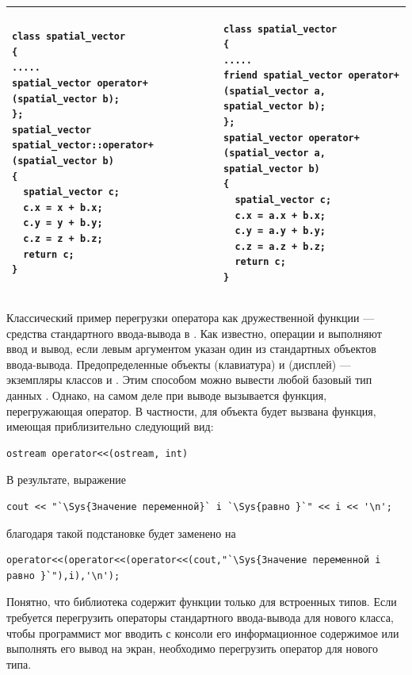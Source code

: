 \begin{center}
\begin{tabular}{|p{}|p{}|}
\hline
\begin{lstlisting}
class spatial_vector 
{
.....
spatial_vector operator+(spatial_vector b);
};
spatial_vector spatial_vector::operator+(spatial_vector b) 
{
  spatial_vector c;
  c.x = x + b.x;
  c.y = y + b.y;
  c.z = z + b.z;
  return c;
}
\end{lstlisting}
&
\begin{lstlisting}
class spatial_vector 
{
.....
friend spatial_vector operator+(spatial_vector a, spatial_vector b);
};
spatial_vector operator+(spatial_vector a, spatial_vector b) 
{
  spatial_vector c;
  c.x = a.x + b.x;
  c.y = a.y + b.y;
  c.z = a.z + b.z;
  return c;
}
\end{lstlisting}
\\\hline
\end{tabular}
\end{center}

Классический пример перегрузки оператора как дружественной функции --- средства стандартного ввода-вывода в . Как
известно, операции \Sys{{<}{<}} и
\Sys{{>}{>}} выполняют ввод и вывод, если левым аргументом указан один из
стандартных объектов ввода-вывода. Предопределенные объекты  (клавиатура) и
 (дисплей) --- экземпляры классов  и
. Этим способом можно вывести любой базовый тип данных . Однако, на самом деле при
выводе вызывается функция, перегружающая оператор. В частности, для объекта  будет вызвана
функция, имеющая приблизительно следующий вид:
\begin{lstlisting}
ostream operator<<(ostream, int)
\end{lstlisting}

В результате, выражение 
\begin{lstlisting}
cout << "`\Sys{Значение переменной}` i `\Sys{равно }`" << i << '\n';
\end{lstlisting}
благодаря такой подстановке будет заменено на
\begin{lstlisting}
operator<<(operator<<(operator<<(cout,"`\Sys{Значение переменной i равно }`"),i),'\n');
\end{lstlisting}

Понятно, что библиотека  содержит функции только для встроенных типов. Если требуется
перегрузить операторы стандартного ввода-вывода для нового класса, чтобы программист мог вводить с консоли его
информационное содержимое или выполнять его вывод на экран, необходимо перегрузить оператор для нового типа. 

